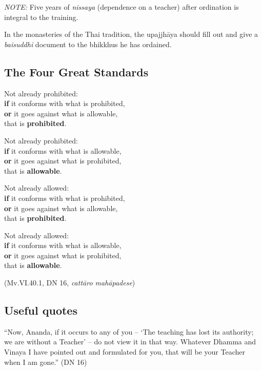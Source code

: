 
\emph{NOTE:} Five years of \emph{nissaya} (dependence on a teacher)
after ordination is integral to the training.

In the monasteries of the Thai tradition, the upajjhāya should fill out
and give a \emph{baisuddhi} document to the bhikkhus he has ordained.

\subsection{The Four Great Standards}

\enlargethispage*{\baselineskip}
\begin{multicols}{2}

Not already prohibited:\\
\textbf{if} it conforms with what is prohibited,\\
\textbf{or} it goes against what is allowable,\\
that is \textbf{prohibited}.

Not already prohibited:\\
\textbf{if} it conforms with what is allowable,\\
\textbf{or} it goes against what is prohibited,\\
that is \textbf{allowable}.

\columnbreak

Not already allowed:\\
\textbf{if} it conforms with what is prohibited,\\
\textbf{or} it goes against what is allowable,\\
that is \textbf{prohibited}.

Not already allowed:\\
\textbf{if} it conforms with what is allowable,\\
\textbf{or} it goes against what is prohibited,\\
that is \textbf{allowable}.

\end{multicols}

(Mv.VI.40.1, DN 16, \emph{cattāro mahāpadese})

\clearpage

\subsection{Useful quotes}

``Now, Ananda, if it occurs to any of you -- `The teaching has lost its
authority; we are without a Teacher' -- do not view it in that way.
Whatever Dhamma and Vinaya I have pointed out and formulated for you,
that will be your Teacher when I am gone.'' (DN 16)

